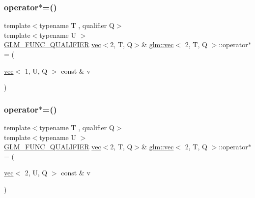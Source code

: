 \mbox{\label{structglm_1_1vec_3_012_00_01_t_00_01_q_01_4_ab1148ae3c3b8be0f46dd17ba8447ee55}} 
\subsubsection{\texorpdfstring{operator$\ast$=()}{operator*=()}\hspace{0.1cm}{\footnotesize\ttfamily [5/6]}}
{\footnotesize\ttfamily template$<$typename T , qualifier Q$>$ \\
template$<$typename U $>$ \\
\mbox{\hyperlink{setup_8hpp_a33fdea6f91c5f834105f7415e2a64407}{G\+L\+M\+\_\+\+F\+U\+N\+C\+\_\+\+Q\+U\+A\+L\+I\+F\+I\+ER}} \mbox{\hyperlink{structglm_1_1vec}{vec}}$<$2, T, Q$>$\& \mbox{\hyperlink{structglm_1_1vec}{glm\+::vec}}$<$ 2, T, Q $>$\+::operator$\ast$= (\begin{DoxyParamCaption}\item[{\mbox{\hyperlink{structglm_1_1vec}{vec}}$<$ 1, U, Q $>$ const \&}]{v }\end{DoxyParamCaption})}

\mbox{\label{structglm_1_1vec_3_012_00_01_t_00_01_q_01_4_a4f386a696770fd88224391b4d41f14e3}} 
\subsubsection{\texorpdfstring{operator$\ast$=()}{operator*=()}\hspace{0.1cm}{\footnotesize\ttfamily [6/6]}}
{\footnotesize\ttfamily template$<$typename T , qualifier Q$>$ \\
template$<$typename U $>$ \\
\mbox{\hyperlink{setup_8hpp_a33fdea6f91c5f834105f7415e2a64407}{G\+L\+M\+\_\+\+F\+U\+N\+C\+\_\+\+Q\+U\+A\+L\+I\+F\+I\+ER}} \mbox{\hyperlink{structglm_1_1vec}{vec}}$<$2, T, Q$>$\& \mbox{\hyperlink{structglm_1_1vec}{glm\+::vec}}$<$ 2, T, Q $>$\+::operator$\ast$= (\begin{DoxyParamCaption}\item[{\mbox{\hyperlink{structglm_1_1vec}{vec}}$<$ 2, U, Q $>$ const \&}]{v }\end{DoxyParamCaption})}

